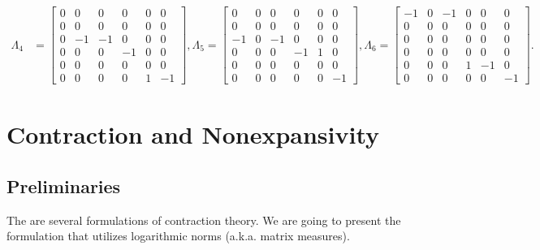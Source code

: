 \documentclass[onefignum,onetabnum]{siamonline220329}
\begin{document}
{{{\begin{align*}
 		\Lambda_4&=\left[\begin{array}{rrrrrrrr} 0 & 0 & 0 & 0 & 0 & 0\\ 0 & 0 & 0 & 0 & 0 & 0\\ 0 & -1 & -1 & 0 & 0 & 0\\ 0 & 0 & 0 & -1 & 0 & 0\\ 0 & 0 & 0 & 0 & 0 & 0\\ 0 & 0 & 0 & 0 & 1 & -1 \end{array}\right], \Lambda_5=\left[\begin{array}{rrrrrrrr} 0 & 0 & 0 & 0 & 0 & 0\\ 0 & 0 & 0 & 0 & 0 & 0\\ -1 & 0 & -1 & 0 & 0 & 0\\ 0 & 0 & 0 & -1 & 1 & 0\\ 0 & 0 & 0 & 0 & 0 & 0\\ 0 & 0 & 0 & 0 & 0 & -1 \end{array}\right], \Lambda_6=\left[\begin{array}{rrrrrrrr} -1 & 0 & -1 & 0 & 0 & 0\\ 0 & 0 & 0 & 0 & 0 & 0\\ 0 & 0 & 0 & 0 & 0 & 0\\ 0 & 0 & 0 & 0 & 0 & 0\\ 0 & 0 & 0 & 1 & -1 & 0\\ 0 & 0 & 0 & 0 & 0 & -1 \end{array}\right].\end{align*}}
 
 
 }
  
 \section{Contraction and Nonexpansivity}
 
 \subsection{Preliminaries}
 
 The are several formulations of contraction theory. We are going to present the formulation that utilizes  logarithmic norms (a.k.a{.} matrix measures).
 
}
\end{document}
